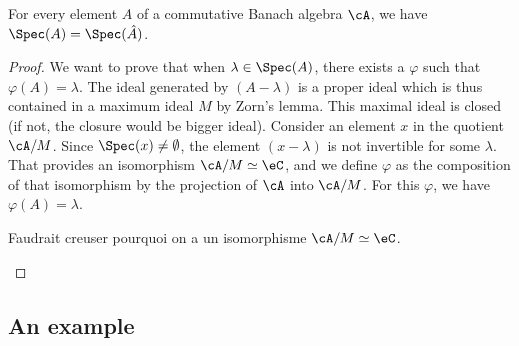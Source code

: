 \begin{theorem}
For every element $A$ of a commutative Banach algebra $\cA$, we have $\Spec(A)=\Spec(\hat A)$.
\end{theorem}

\begin{proof}
We want to prove that when $\lambda\in\Spec(A)$, there exists a $\varphi$ such that $\varphi(A)=\lambda$. The ideal generated by $(A-\lambda)$ is a proper ideal which is thus contained in a maximum ideal $M$ by Zorn's lemma. This maximal ideal is closed (if not, the closure would be bigger ideal). Consider an element $x$ in the quotient $\cA/M$. Since $\Spec(x)\neq\emptyset$, the element $(x-\lambda)$ is not invertible for some $\lambda$. That provides an isomorphism $\cA/M\simeq \eC$, and we define $\varphi$ as the composition of that isomorphism by the projection of $\cA$ into $\cA/M$. For this $\varphi$, we have $\varphi(A)=\lambda$.

\begin{probleme}
Faudrait creuser pourquoi on a un isomorphisme $\cA/M\simeq\eC$.
\end{probleme}
\end{proof}

\subsection{An example}

